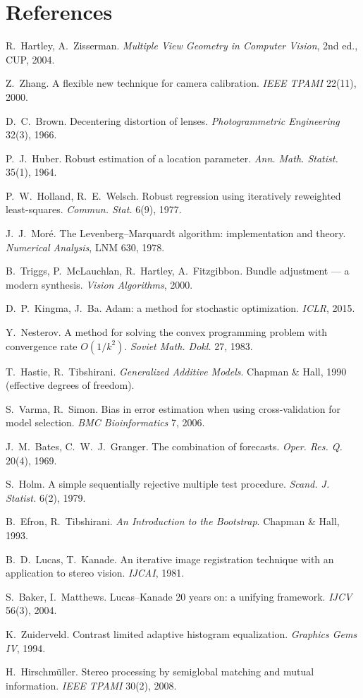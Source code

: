 \documentclass[11pt,a4paper]{article}
\begin{document}
\section*{References}
\small
\begin{enumerate}[label={[\arabic*]}]
\item R.~Hartley, A.~Zisserman. \emph{Multiple View Geometry in Computer Vision}, 2nd ed., CUP, 2004.
\item Z.~Zhang. A flexible new technique for camera calibration. \emph{IEEE TPAMI} 22(11), 2000.
\item D.~C.~Brown. Decentering distortion of lenses. \emph{Photogrammetric Engineering} 32(3), 1966.
\item P.~J.~Huber. Robust estimation of a location parameter. \emph{Ann. Math. Statist.} 35(1), 1964.
\item P.~W.~Holland, R.~E.~Welsch. Robust regression using iteratively reweighted least-squares. \emph{Commun. Stat.} 6(9), 1977.
\item J.~J.~Mor\'e. The Levenberg--Marquardt algorithm: implementation and theory. \emph{Numerical Analysis}, LNM 630, 1978.
\item B.~Triggs, P.~McLauchlan, R.~Hartley, A.~Fitzgibbon. Bundle adjustment --- a modern synthesis. \emph{Vision Algorithms}, 2000.
\item D.~P.~Kingma, J.~Ba. Adam: a method for stochastic optimization. \emph{ICLR}, 2015.
\item Y.~Nesterov. A method for solving the convex programming problem with convergence rate $O(1/k^2)$. \emph{Soviet Math. Dokl.} 27, 1983.
\item T.~Hastie, R.~Tibshirani. \emph{Generalized Additive Models}. Chapman \& Hall, 1990 (effective degrees of freedom).
\item S.~Varma, R.~Simon. Bias in error estimation when using cross-validation for model selection. \emph{BMC Bioinformatics} 7, 2006.
\item J.~M.~Bates, C.~W.~J.~Granger. The combination of forecasts. \emph{Oper. Res. Q.} 20(4), 1969.
\item S.~Holm. A simple sequentially rejective multiple test procedure. \emph{Scand. J. Statist.} 6(2), 1979.
\item B.~Efron, R.~Tibshirani. \emph{An Introduction to the Bootstrap}. Chapman \& Hall, 1993.
\item B.~D.~Lucas, T.~Kanade. An iterative image registration technique with an application to stereo vision. \emph{IJCAI}, 1981.
\item S.~Baker, I.~Matthews. Lucas--Kanade 20 years on: a unifying framework. \emph{IJCV} 56(3), 2004.
\item K.~Zuiderveld. Contrast limited adaptive histogram equalization. \emph{Graphics Gems IV}, 1994.
\item H.~Hirschm\"uller. Stereo processing by semiglobal matching and mutual information. \emph{IEEE TPAMI} 30(2), 2008.
\end{enumerate}
\end{document}
